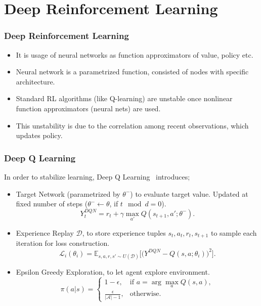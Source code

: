 \documentclass{beamer}
\begin{document}
\section{Deep Reinforcement Learning}
\begin{frame}
\frametitle{Deep Reinforcement Learning}
\begin{itemize}
	\item It is usage of neural networks as function approximators of value, policy etc.
	\item Neural network is a parametrized function, consisted of nodes with specific architecture. 
	\item Standard RL algorithms (like Q-learning) are unstable once nonlinear function approximators (neural nets) are used. 
	\item This unstability is due to the correlation among recent observations, which updates policy. 
\end{itemize}
\end{frame}


\begin{frame}
\frametitle{Deep Q Learning}
In order to stabilize learning, Deep Q Learning~\cite{mnih_human-level_2015, mnih_playing_2013} introduces;
\begin{itemize}
	\item Target Network (parametrized by $\theta^-$) to evaluate target value. Updated at fixed number of steps ($\theta^- \leftarrow \theta$, if $t\mod d = 0$).
	\begin{equation}
	\label{eqn:dqn_ntarget}
	Y_t^{DQN} = r_t + \gamma \max_{a'} Q(s_{t+1},a';\theta^-).
	\end{equation}
	\item Experience Replay $\mathcal{D}$, to store experience tuples $s_t,a_t,r_t,s_{t+1}$ to sample each iteration for loss construction. 
	\begin{equation}
	\label{eqn:dqn_loss}
	\mathcal{L}_i(\theta_i) = \mathbb{E}_{s,a,r,s'\sim U(\mathcal{D})}\Big[\big( Y^{DQN} - Q(s,a;\theta_i) \big) ^ 2 \Big].
	\end{equation}
	\item Epsilon Greedy Exploration, to let agent explore environment. 
	\begin{equation}
	\label{eqn:egreedy_policy}
	\pi(a|s) = 
	\begin{cases}
	1-\epsilon,   & \text{if } a = \arg \max_{a} Q(s, a), \\
	\frac{\epsilon}{|\mathcal{A}|-1},     & \text{otherwise}.
	\end{cases}
	\end{equation}
\end{itemize}
\end{frame}
\end{document}
